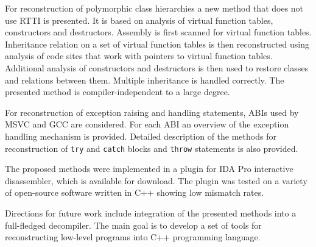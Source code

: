 \documentclass[times, 10pt,twocolumn]{article}
\renewcommand{\~}{{\raise.35ex\hbox{$\scriptstyle\sim$}}}
\begin{document}
For reconstruction of polymorphic class hierarchies a new
method that does not use RTTI is presented. It is based on analysis of
virtual function tables, constructors and destructors.
Assembly is first scanned for virtual function tables.
Inheritance relation on a set of virtual function tables is then reconstructed
using analysis of code sites that work with pointers to virtual function tables.
Additional analysis of constructors and destructors is then used to restore
classes and relations between them. Multiple inheritance is handled
correctly. The presented method is compiler-independent to a large degree.

For reconstruction of exception raising and handling statements,
ABIs used by MSVC and GCC are considered. For each ABI an overview of the
exception handling mechanism is provided. Detailed description of the
methods for reconstruction of \lstinline{try} and \lstinline{catch} blocks
and \lstinline{throw} statements is also provided.

The proposed methods were implemented in a plugin for IDA Pro interactive disassembler,
which is available for download.
The plugin was tested on a variety of open-source software written in C++
showing low mismatch rates.

Directions for future work include integration of the presented methods
into a full-fledged decompiler.
The main goal is to develop a set of tools for reconstructing
low-level programs into C++ programming language.




\quad


\end{document}

